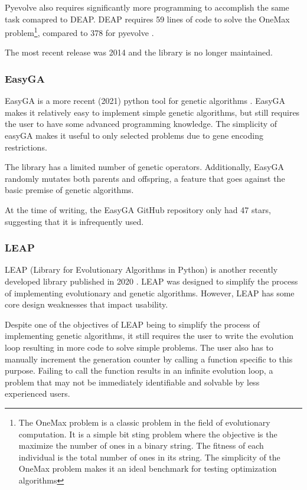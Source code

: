 \documentclass[12pt]{report}
\begin{document}
Pyevolve also requires significantly more programming to accomplish the same task comapred to DEAP. DEAP requires 59 lines of code to solve the OneMax problem\footnote{The OneMax problem is a classic problem in the field of evolutionary computation. It is a simple bit sting problem where the objective is the maximize the number of ones in a binary string. The fitness of each individual is the total number of ones in its string. The simplicity of the OneMax problem makes it an ideal benchmark for testing optimization algorithms}, compared to 378 for pyevolve \cite{LEAP}. 

The most recent release was 2014 and the library is no longer maintained.

\subsubsection{EasyGA}
EasyGA is a more recent (2021) python tool for genetic algorithms \cite{easyGA}. EasyGA makes it relatively easy to implement simple genetic algorithms, but still requires the user to have some advanced programming knowledge. The simplicity of easyGA makes it useful to only selected problems due to gene encoding restrictions.

The library has a limited number of genetic operators. Additionally, EasyGA randomly mutates both parents and offspring, a feature that goes against the basic premise of genetic algorithms. 

At the time of writing, the EasyGA GitHub repository only had 47 stars, suggesting that it is infrequently used.

\subsubsection{LEAP}
LEAP (Library for Evolutionary Algorithms in Python) is another recently developed library published in 2020 \cite{LEAP}. LEAP was designed to simplify the process of implementing evolutionary and genetic algorithms. However, LEAP has some core design weaknesses that impact usability. 

Despite one of the objectives of LEAP being to simplify the process of implementing genetic algorithms, it still requires the user to write the evolution loop resulting in more code to solve simple problems. The user also has to manually increment the generation counter by calling a function specific to this purpose. Failing to call the function results in an infinite evolution loop, a problem that may not be immediately identifiable and solvable by less experienced users.
\end{document}
